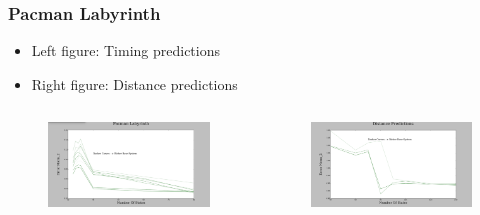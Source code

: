 \documentclass{beamer}
\begin{document}


\begin{frame}
\frametitle{Pacman Labyrinth}

\begin{itemize}
\item Left figure: Timing predictions
\item Right figure: Distance predictions

\end{itemize}


\begin{columns}[c]

\begin{figure}
\includegraphics[width=1.0\linewidth]{lucasplots/monImages/PacmanLabyrinth.png}
\end{figure}


\begin{figure}
\includegraphics[width=1.0\linewidth]{lucasplots/monImages/Distance_Predictions.png}
\end{figure}

\end{columns}


\end{frame}
\end{document}
